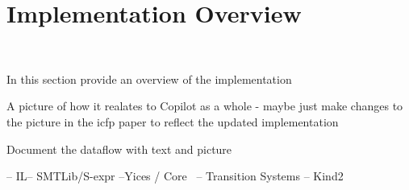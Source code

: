 \section{Implementation Overview}~\label{sec:overview}

In this section provide an overview of the implementation

A picture of how it realates to Copilot as a whole - maybe just make changes to the picture in the icfp paper to reflect the updated implementation

Document the dataflow with text and picture

 
     -- IL-- SMTLib/S-expr --Yices
    /
Core 
    \ 
      -- Transition Systems -- Kind2
 

